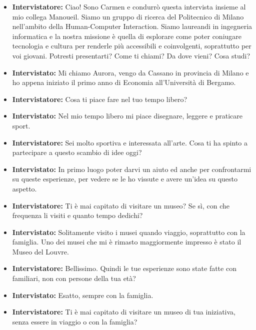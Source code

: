\documentclass{article}
\begin{document}
\begin{itemize}
    \item \textbf{Intervistatore:} Ciao! Sono Carmen e condurrò questa intervista insieme al mio collega Manoueil. Siamo un gruppo di ricerca del Politecnico di Milano nell’ambito della Human-Computer Interaction. Siamo laureandi in ingegneria informatica e la nostra missione è  quella di esplorare come poter coniugare tecnologia e cultura per renderle più accessibili e coinvolgenti, soprattutto per voi giovani. Potresti presentarti? Come ti chiami? Da dove vieni? Cosa studi?
    
    \item \textbf{Intervistato:} Mi chiamo Aurora, vengo da Cassano in provincia di Milano e ho appena iniziato il primo anno di Economia all’Università di Bergamo.
    
    \item \textbf{Intervistatore:} Cosa ti piace fare nel tuo tempo libero?
    
    \item \textbf{Intervistato:} Nel mio tempo libero mi piace disegnare, leggere e praticare sport.
    
    \item \textbf{Intervistatore:} Sei molto sportiva e interessata all’arte. Cosa ti ha spinto a partecipare a questo scambio di idee oggi?
    
    \item \textbf{Intervistato:} In primo luogo poter darvi un aiuto ed anche per confrontarmi su queste esperienze, per vedere se le ho vissute e avere un’idea su questo aspetto.
    
    \item \textbf{Intervistatore:} Ti è mai capitato di visitare un museo? Se sì, con che frequenza li visiti e quanto tempo dedichi?
    
    \item \textbf{Intervistato:} Solitamente visito i musei quando viaggio, soprattutto con la famiglia. Uno dei musei che mi è rimasto maggiormente impresso è stato il Museo del Louvre.
    
    \item \textbf{Intervistatore:} Bellissimo. Quindi le tue esperienze sono state fatte con familiari, non con persone della tua età?
    
    \item \textbf{Intervistato:} Esatto, sempre con la famiglia.
    
    \item \textbf{Intervistatore:} Ti è mai capitato di visitare un museo di tua iniziativa, senza essere in viaggio o con la famiglia?
    

\end{itemize}
\end{document}
